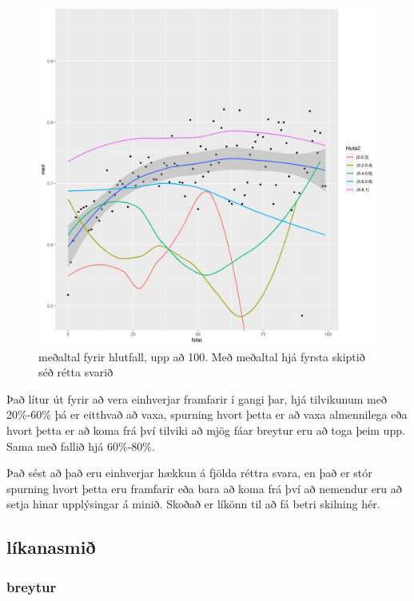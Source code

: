\documentclass[
  12pt,
]{article}
\begin{document}
\begin{figure}[H]

{\centering \includegraphics[width=1\linewidth]{Img/meabwhsbyhlutfall100} 

}

\caption{meðaltal fyrir hlutfall, upp að 100. Með meðaltal hjá fyrsta skiptið séð rétta svarið}\label{fig:meanbyhlutfallandhsta100}
\end{figure}

Það lítur út fyrir að vera einhverjar framfarir í gangi þar, hjá tilvikunum með 20\%-60\% þá er eitthvað að vaxa, spurning hvort þetta er að vaxa almennilega eða hvort þetta er að koma frá því tilviki að mjög fáar breytur eru að toga þeim upp.
Sama með fallið hjá 60\%-80\%.

Það sést að það eru einhverjar hækkun á fjölda réttra svara, en það er stór spurning hvort þetta eru framfarir eða bara að koma frá því að nemendur eru að setja hinar upplýsingar á minið. Skoðað er líkönn til að fá betri skilning hér.

\hypertarget{luxedkanasmiuxf0}{%
\subsection{líkanasmið}\label{luxedkanasmiuxf0}}

\hypertarget{breytur-1}{%
\subsubsection{breytur}\label{breytur-1}}
\end{document}
